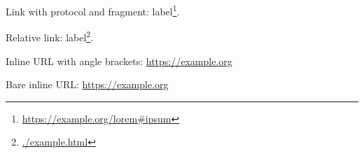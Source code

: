 Link with protocol and fragment: label\footnote{\url{https://example.org/lorem\#ipsum}}.

Relative link: label\footnote{\url{./example.html}}.

Inline URL with angle brackets: \url{https://example.org}

Bare inline URL: \url{https://example.org}

